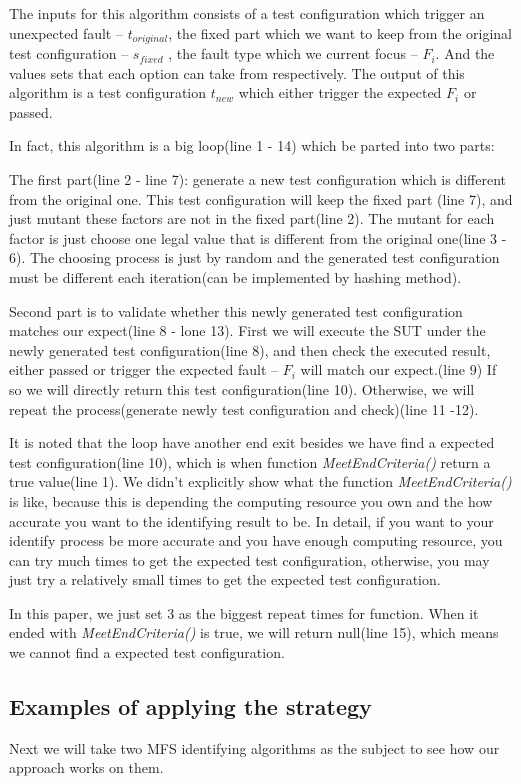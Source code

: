 \documentclass{sig-alternate}
\begin{document}
The inputs for this algorithm consists of a test configuration which trigger an unexpected fault -- $t_{original}$, the fixed part which we want to keep from the original test configuration -- $s_{fixed}$ , the fault type which we current focus -- $F_{i}$. And the values sets that each option can take from respectively.  The output of this algorithm is a test configuration $t_{new}$ which either trigger the expected $F_{i}$ or passed.

In fact, this algorithm is a big loop(line 1 - 14) which be parted into two parts:

The first part(line 2 - line 7): generate a new test configuration which is different from the original one. This test configuration will keep the fixed part (line 7), and just mutant these factors are not in the fixed part(line 2). The mutant for each factor is just choose one legal value that is different from the original one(line 3 - 6). The choosing process is just by random and the generated test configuration must be different each iteration(can be implemented by hashing method).

Second part is to validate whether this newly generated test configuration matches our expect(line 8 - lone 13). First we will execute the SUT under the newly generated test configuration(line 8), and then check the executed result, either passed or trigger the expected fault -- $F_{i}$ will match our expect.(line 9) If so we will directly return this test configuration(line 10). Otherwise, we will repeat the process(generate newly test configuration and check)(line 11 -12).

It is noted that the loop have another end exit besides we have find a expected test configuration(line 10), which is when function \emph{MeetEndCriteria()} return a true value(line 1). We didn't explicitly show what the function \emph{MeetEndCriteria()} is like, because this is depending the computing resource you own and the how accurate you want to the identifying result to be. In detail, if you want to your identify process be more accurate and you have enough computing resource, you can try much times to get the expected test configuration, otherwise, you may just try a relatively small times to get the expected test configuration.

In this paper, we just set 3 as the biggest repeat times for function. When it ended with \emph{MeetEndCriteria()} is true, we will return null(line 15), which means we cannot find a expected test configuration.

\subsection{Examples of applying the strategy}
Next we will take two MFS identifying algorithms as the subject to see how our approach works on them.
\end{document}
